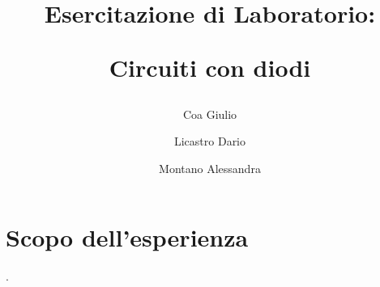 \documentclass[a4paper]{article}
\title{
		\begin{center}
			Esercitazione di Laboratorio:
		\end{center}
		\newline
		\begin{center}
			Circuiti con diodi
		\end{center}
	}
\author{
			Coa Giulio
			\and
			Licastro Dario
			\and
			Montano Alessandra
		}
\begin{document}
	\begin{titlingpage}
		\maketitle
	\end{titlingpage}
	\newpage
	\section{Scopo dell'esperienza}
		.
\end{document}

